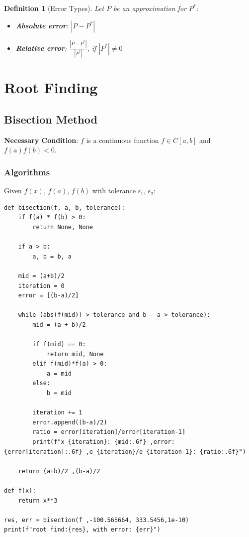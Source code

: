 \documentclass[12pt, a4paper]{article}
\theoremstyle{break}
\newtheorem{definition}{Definition}[section]
\begin{document}
\begin{definition}[Error Types]
Let $P$ be an approximation for $P^*$:
\begin{itemize}
    \item \textbf{Absolute error}: $|P - P^*|$
    \item \textbf{Relative error}: $\frac{|P - P^*|}{|P^*|}$, if $|P^*| \neq 0$
\end{itemize}
\end{definition}

\section{Root Finding}
\subsection{Bisection Method}

\textbf{Necessary Condition}: $f$ is a continuous function $f \in C[a,b]$ and $f(a)f(b) < 0$.

\subsubsection{Algorithms}
Given $f(x)$, $f(a)$, $f(b)$ with tolerance $\epsilon_1$, $\epsilon_2$:

\begin{lstlisting}
def bisection(f, a, b, tolerance):
    if f(a) * f(b) > 0:
        return None, None

    if a > b:
        a, b = b, a

    mid = (a+b)/2
    iteration = 0
    error = [(b-a)/2]
    
    while (abs(f(mid)) > tolerance and b - a > tolerance):
        mid = (a + b)/2
    
        if f(mid) == 0:
            return mid, None
        elif f(mid)*f(a) > 0:
            a = mid
        else:
            b = mid
            
        iteration += 1
        error.append((b-a)/2)
        ratio = error[iteration]/error[iteration-1]
        print(f"x_{iteration}: {mid:.6f} ,error: {error[iteration]:.6f} ,e_{iteration}/e_{iteration-1}: {ratio:.6f}")
        
    return (a+b)/2 ,(b-a)/2

def f(x):
    return x**3

res, err = bisection(f ,-100.565664, 333.5456,1e-10)
print(f"root find:{res}, with error: {err}")
\end{lstlisting}
\end{document}
